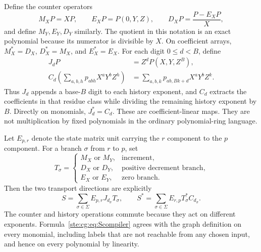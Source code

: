 \documentclass[11pt,letterpaper]{article}
\theoremstyle{definition}
\theoremstyle{remark}
\begin{document}
Define the counter operators
\begin{equation}\label{ste:cg:eq:counterops}
 M_XP=XP,\qquad E_XP=P(0,Y,Z),\qquad
 D_XP=\frac{P-E_XP}{X},
\end{equation}
and define $M_Y,E_Y,D_Y$ similarly. The quotient in this notation is an
exact polynomial because its numerator is divisible by $X$. On coefficient
arrays, $M_X^*=D_X$, $D_X^*=M_X$, and $E_X^*=E_X$.
For each digit $0\le d<B$, define
\begin{align}
 J_dP&=Z^d P(X,Y,Z^B),\label{ste:cg:eq:append}\\
 C_d\!\left(\sum_{a,b,h}p_{abh}X^aY^bZ^h\right)
 &=\sum_{a,b,k}p_{ab,Bk+d}X^aY^bZ^k.\label{ste:cg:eq:extract}
\end{align}
Thus $J_d$ appends a base-$B$ digit to each history exponent, and $C_d$
extracts the coefficients in that residue class while dividing the
remaining history exponent by $B$. Directly on monomials, $J_d^*=C_d$.
These are coefficient-linear maps. They are not multiplication by fixed
polynomials in the ordinary polynomial-ring language.

Let $E_{p,r}$ denote the state matrix unit carrying the $r$ component to
the $p$ component. For a branch $\sigma$ from $r$ to $p$, set
\[
 T_\sigma=
 \begin{cases}
 M_X\text{ or }M_Y,&\text{increment},\\
 D_X\text{ or }D_Y,&\text{positive decrement branch},\\
 E_X\text{ or }E_Y,&\text{zero branch}.
 \end{cases}
\]
Then the two transport directions are explicitly
\begin{equation}\label{ste:cg:eq:Scompiler}
 S=\sum_{\sigma\in\Sigma}E_{p,r}J_{d_\sigma}T_\sigma,
 \qquad
 S^*=\sum_{\sigma\in\Sigma}E_{r,p}T_\sigma^*C_{d_\sigma}.
\end{equation}
The counter and history operations commute because they act on different
exponents. Formula~\eqref{ste:cg:eq:Scompiler} agrees with the graph definition
on every monomial, including labels that are not reachable from any
chosen input, and hence on every polynomial by linearity.
\end{document}
